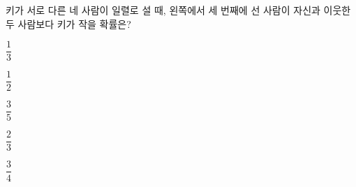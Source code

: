 키가 서로 다른 네 사람이 일렬로 설 때, 왼쪽에서 세 번째에 선 사람이 자신과 이웃한 두 사람보다 키가 작을 확률은?
\begin{choices32}{\rule[-3ex]{0pt}{8ex}$\dfrac{1}{3}$}{\rule[-3ex]{0pt}{8ex}$\dfrac{1}{2}$}{\rule[-3ex]{0pt}{8ex}$\dfrac{3}{5}$}{\rule[-3ex]{0pt}{8ex}$\dfrac{2}{3}$}{\rule[-3ex]{0pt}{8ex}$\dfrac{3}{4}$}\end{choices32}
